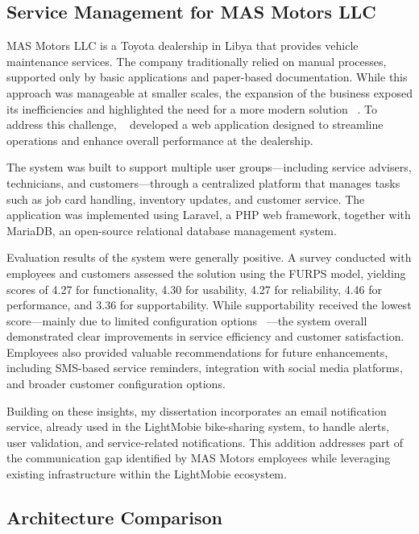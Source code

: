\subsection{Service Management for MAS Motors LLC}
MAS Motors LLC is a Toyota dealership in Libya that provides vehicle maintenance services. The company traditionally relied on manual processes, supported only by basic applications and paper-based documentation. While this approach was manageable at smaller scales, the expansion of the business exposed its inefficiencies and highlighted the need for a more modern solution ~\cite{MAS_MOTORS}. To address this challenge, ~\citet{MAS_MOTORS} developed a web application designed to streamline operations and enhance overall performance at the dealership.

The system was built to support multiple user groups—including service advisers, technicians, and customers—through a centralized platform that manages tasks such as job card handling, inventory updates, and customer service. The application was implemented using Laravel, a PHP web framework, together with MariaDB, an open-source relational database management system.

Evaluation results of the system were generally positive. A survey conducted with employees and customers assessed the solution using the \ac{FURPS} model, yielding scores of 4.27 for functionality, 4.30 for usability, 4.27 for reliability, 4.46 for performance, and 3.36 for supportability. While supportability received the lowest score—mainly due to limited configuration options ~\cite{MAS_MOTORS}—the system overall demonstrated clear improvements in service efficiency and customer satisfaction. Employees also provided valuable recommendations for future enhancements, including SMS-based service reminders, integration with social media platforms, and broader customer configuration options.

Building on these insights, my dissertation incorporates an email notification service, already used in the LightMobie bike-sharing system, to handle alerts, user validation, and service-related notifications. This addition addresses part of the communication gap identified by MAS Motors employees while leveraging existing infrastructure within the LightMobie ecosystem.

\subsection{Architecture Comparison}

